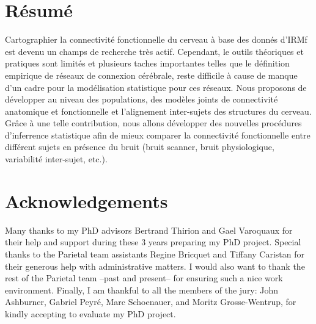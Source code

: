 \documentclass[nobib, a4paper, notoc, twoside, justified, openany]{tufte-book}
\begin{document}
\chapter*{R\'esum\'e}
Cartographier la connectivit\'e fonctionnelle du cerveau à base des donn\'es d'IRMf est devenu un champs de recherche tr\`es actif. Cependant, le outils th\'eoriques et pratiques sont limit\'es et plusieurs taches importantes telles que le d\'efinition empirique de r\'eseaux de connexion c\'er\'ebrale, reste difficile à cause de manque d'un cadre pour la mod\'elisation statistique pour ces r\'eseaux. Nous proposons de d\'evelopper au niveau des populations, des mod\`eles joints de connectivit\'e anatomique et fonctionnelle et l'alignement inter-sujets des structures du cerveau. Grâce à une telle contribution, nous allons d\'evelopper des nouvelles proc\'edures d'inferrence statistique afin de mieux comparer la connectivit\'e fonctionnelle entre diff\'erent sujets en pr\'esence du bruit (bruit scanner, bruit physiologique, variabilit\'e inter-sujet, etc.).

\clearpage
\thispagestyle{plain}
\par{}
\chapter*{Acknowledgements}
Many thanks to my PhD advisors Bertrand Thirion and Gael Varoquaux for
their help and support during these 3 years preparing my PhD project.
Special thanks to the Parietal team assistants Regine Bricquet and Tiffany Caristan for their generous help with administrative matters.
I would also want to thank the rest of the Parietal team --past and present-- for ensuring such a nice work environment.
Finally, I am thankful to all the members of the jury: John Ashburner, Gabriel Peyr\'e, Marc Schoenauer, and Moritz Grosse-Wentrup, for kindly accepting to evaluate my PhD project.
\end{document}
